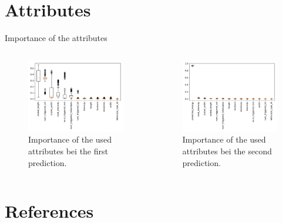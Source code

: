 \documentclass[aspectratio=1610, professionalfonts, 9pt]{beamer}
\begin{document}
\section{Attributes}
  \begin{frame}{Importance of the attributes}
    \begin{columns}
      \begin{column}{0.5\textwidth}
        \begin{figure}
          \centering
          \includegraphics[width=\textwidth]{Plots/feautureimportance_boxplot.pdf}
          \caption{Importance of the used attributes bei the first prediction.}
        \end{figure}
      \end{column}
      \begin{column}{0.5\textwidth}
        \begin{figure}
          \centering
          \includegraphics[width=\textwidth]{Plots/feautureimportance_boxplot_secondForest.pdf}
          \caption{Importance of the used attributes bei the second prediction.}
        \end{figure}
      \end{column}
    \end{columns}
  \end{frame}
\section{References}
  \printbibliography
\end{document}
